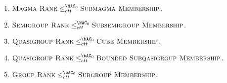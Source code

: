 \documentclass{article}
\begin{document}
\begin{lemma}\label{lem:ranktomem}
  \mbox{}
  \begin{enumerate}
  \item $\textsc{Magma Rank} \leq^{\NAC_0}_{ctt} \textsc{Submagma Membership}$.
  \item $\textsc{Semigroup Rank} \leq^{\NAC_0}_{ctt} \textsc{Subsemigroup Membership}$.
  \item $\textsc{Quasigroup Rank} \leq^{\bAC_0}_{ctt} \textsc{Cube Membership}$.
  \item $\textsc{Quasigroup Rank} \leq^{\bAC_0}_{ctt} \textsc{Bounded Subqasigroup Membership}$.
  \item $\textsc{Group Rank} \leq^{\bAC_0}_{ctt} \textsc{Subgroup Membership}$.
  \end{enumerate}
\end{lemma}
\end{document}
